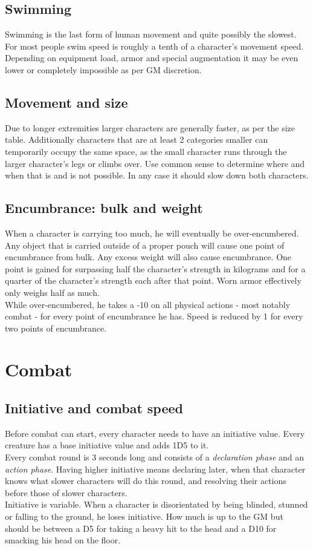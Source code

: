 \documentclass[12pt,a4paper,openany]{book}
\begin{document}
	\section{Swimming}
	Swimming is the last form of human movement and quite possibly the slowest. For most people swim speed is roughly a tenth of a character’s movement speed. Depending on equipment load, armor and special augmentation it may be even lower or completely impossible as per GM discretion.
	\section{Movement and size}
	Due to longer extremities larger characters are generally faster, as per the size table. Additionally characters that are at least 2 categories smaller can temporarily occupy the same space, as the small character runs through the larger character’s legs or climbs over. Use common sense to determine where and when that is and is not possible. In any case it should slow down both characters.
	\section{Encumbrance: bulk and weight}
	When a character is carrying too much, he will eventually be over-encumbered. Any object that is carried outside of a proper pouch will cause one point of encumbrance from bulk.
	Any excess weight will also cause encumbrance. One point is gained for surpassing half the character’s strength in kilograms and for a quarter of the character’s strength each after that point. Worn armor effectively only weighs half as much.\\
	While over-encumbered, he takes a -10 on all physical actions - most notably combat - for every point of encumbrance he has. Speed is reduced by 1 for every two points of encumbrance.
	
	\chapter{Combat}
	\section{Initiative and combat speed}
	Before combat can start, every character needs to have an initiative value. Every creature has a base initiative value and adds 1D5 to it.\\
	Every combat round is 3 seconds long and consists of a \textit{declaration phase} and an \textit{action phase}. Having higher initiative means declaring later, when that character knows what slower characters will do this round, and resolving their actions before those of slower characters.\\
	Initiative is variable. When a character is disorientated by being blinded, stunned or falling to the ground, he loses initiative. How much is up to the GM but should be between a D5 for taking a heavy hit to the head and a D10 for smacking his head on the floor.
\end{document}
